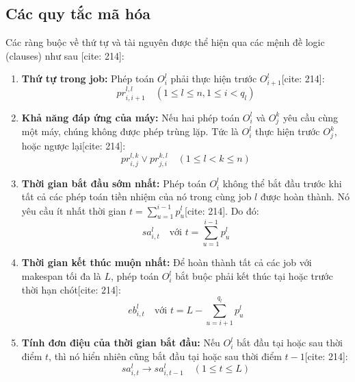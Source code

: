 \documentclass[a4paper,fleqn]{cas-sc} %
\begin{document}
\subsection{Các quy tắc mã hóa}
Các ràng buộc về thứ tự và tài nguyên được thể hiện qua các mệnh đề logic (clauses) như sau \cite{koshimura2010solving}[cite: 214]:

\begin{enumerate}
    \item \textbf{Thứ tự trong job:} Phép toán $O_i^l$ phải thực hiện trước $O_{i+1}^l$[cite: 214]:
    \begin{equation}
        pr_{i,i+1}^{l,l} \quad (1 \le l \le n, 1 \le i < q_l)
    \end{equation}
    
    \item \textbf{Khả năng đáp ứng của máy:} Nếu hai phép toán $O_i^l$ và $O_j^k$ yêu cầu cùng một máy, chúng không được phép trùng lặp. Tức là $O_i^l$ thực hiện trước $O_j^k$, hoặc ngược lại[cite: 214]:
    \begin{equation}
        pr_{i,j}^{l,k} \lor pr_{j,i}^{k,l} \quad (1 \le l < k \le n)
    \end{equation}
    
    \item \textbf{Thời gian bắt đầu sớm nhất:} Phép toán $O_i^l$ không thể bắt đầu trước khi tất cả các phép toán tiền nhiệm của nó trong cùng job $l$ được hoàn thành. Nó yêu cầu ít nhất thời gian $t = \sum_{u=1}^{i-1} p_u^l$[cite: 214]. Do đó:
    \begin{equation}
        sa_{i,t}^l \quad \text{với } t = \sum_{u=1}^{i-1} p_u^l
    \end{equation}
    
    \item \textbf{Thời gian kết thúc muộn nhất:} Để hoàn thành tất cả các job với makespan tối đa là $L$, phép toán $O_i^l$ bắt buộc phải kết thúc tại hoặc trước thời hạn chót[cite: 214]:
    \begin{equation}
        eb_{i,t}^l \quad \text{với } t = L - \sum_{u=i+1}^{q_l} p_u^l
    \end{equation}
    
    \item \textbf{Tính đơn điệu của thời gian bắt đầu:} Nếu $O_i^l$ bắt đầu tại hoặc sau thời điểm $t$, thì nó hiển nhiên cũng bắt đầu tại hoặc sau thời điểm $t-1$[cite: 214]:
    \begin{equation}
        sa_{i,t}^l \to sa_{i,t-1}^l \quad (1 \le t \le L)
    \end{equation}
    

\end{enumerate}
\end{document}

